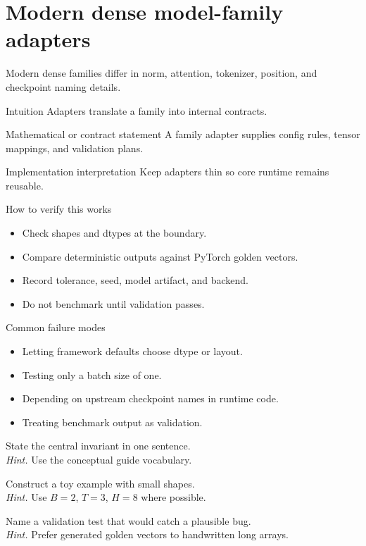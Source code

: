 \chapter{Modern dense model-family adapters}
\label{ch:family-adapters}
Modern dense families differ in norm, attention, tokenizer, position, and checkpoint naming details.



\begin{intuitionbox}{Intuition}
Adapters translate a family into internal contracts.
\end{intuitionbox}

\begin{definitionbox}{Mathematical or contract statement}
A family adapter supplies config rules, tensor mappings, and validation plans.
\end{definitionbox}

\begin{implementationbox}{Implementation interpretation}
Keep adapters thin so core runtime remains reusable.
\end{implementationbox}

\begin{verificationbox}{How to verify this works}
\begin{itemize}
\item Check shapes and dtypes at the boundary.
\item Compare deterministic outputs against PyTorch golden vectors.
\item Record tolerance, seed, model artifact, and backend.
\item Do not benchmark until validation passes.
\end{itemize}
\end{verificationbox}

\begin{warningbox}{Common failure modes}
\begin{itemize}
\item Letting framework defaults choose dtype or layout.
\item Testing only a batch size of one.
\item Depending on upstream checkpoint names in runtime code.
\item Treating benchmark output as validation.
\end{itemize}
\end{warningbox}

\begin{chapterexercises}
\item State the central invariant in one sentence.\\
\textit{Hint.} Use the conceptual guide vocabulary.
\item Construct a toy example with small shapes.\\
\textit{Hint.} Use $B=2$, $T=3$, $H=8$ where possible.
\item Name a validation test that would catch a plausible bug.\\
\textit{Hint.} Prefer generated golden vectors to handwritten long arrays.
\end{chapterexercises}

